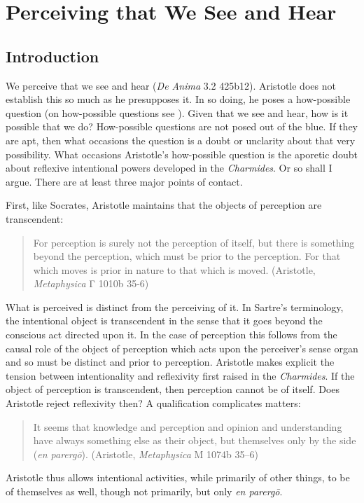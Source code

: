 \chapter{Perceiving that We See and Hear} %
\label{cha:perceiving}

\section{Introduction} %
\label{sec:introduction2}

We perceive that we see and hear (\emph{De Anima} 3.2 425b12). Aristotle does not establish this so much as he presupposes it. In so doing, he poses a how-possible question (on how-possible questions see \citealt{Cassam:2007lq}). Given that we see and hear, how is it possible that we do? How-possible questions are not posed out of the blue. If they are apt, then what occasions the question is a doubt or unclarity about that very possibility. What occasions Aristotle's how-possible question is the aporetic doubt about reflexive intentional powers developed in the \emph{Charmides}. Or so shall I argue. There are at least three major points of contact. 

First, like Socrates, Aristotle maintains that the objects of perception are transcendent:
\begin{quote}
	For perception is surely not the perception of itself, but there is something beyond the perception, which must be prior to the perception. For that which moves is prior in nature to that which is moved. (Aristotle, \emph{Metaphysica} {\sbl Γ} 1010b 35-6)
\end{quote}
What is perceived is distinct from the perceiving of it. In Sartre's terminology, the intentional object is transcendent in the sense that it goes beyond the conscious act directed upon it. In the case of perception this follows from the causal role of the object of perception which acts upon the perceiver's sense organ and so must be distinct and prior to perception. Aristotle makes explicit the tension between intentionality and reflexivity first raised in the \emph{Charmides}. If the object of perception is transcendent, then perception cannot be of itself. Does Aristotle reject reflexivity then? A qualification complicates matters:
\begin{quote}
	It seems that knowledge and perception and opinion and understanding have always something else as their object, but themselves only by the side (\emph{en parergō}). (Aristotle, \emph{Metaphysica} {\sbl Μ} 1074b 35–6)
\end{quote}
Aristotle thus allows intentional activities, while primarily of other things, to be of themselves as well, though not primarily, but only \emph{en parergō}.


